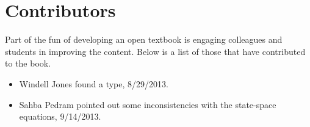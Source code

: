 \chapter{Contributors}
Part of the fun of developing an open textbook is engaging colleagues and students in improving the content.  Below is a list of those that have contributed to the book.
\begin{itemize}
\item Windell Jones found a type, 8/29/2013.
\item Sahba Pedram pointed out some inconsistencies with the state-space equations, 9/14/2013.
\end{itemize}

